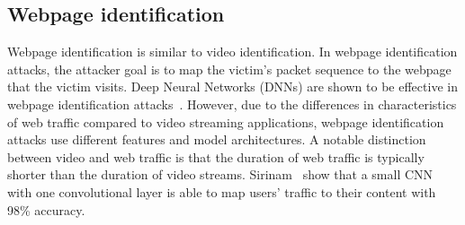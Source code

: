 \subsection{Webpage identification}
Webpage identification is similar to video identification.
In webpage identification attacks, the attacker goal is to map the victim's packet sequence to the webpage that the victim visits. 
Deep Neural Networks (DNNs) are shown to be effective in webpage identification attacks~\cite{sirinam2018df}.
However, due to the differences in characteristics of web traffic compared to video streaming applications, webpage identification attacks use different features and model architectures. 
A notable distinction between video and web traffic is that the duration of web traffic is typically shorter than the duration of video streams.
Sirinam~ show that a small CNN with one convolutional layer is able to map users' traffic to their content with 98\% accuracy.

